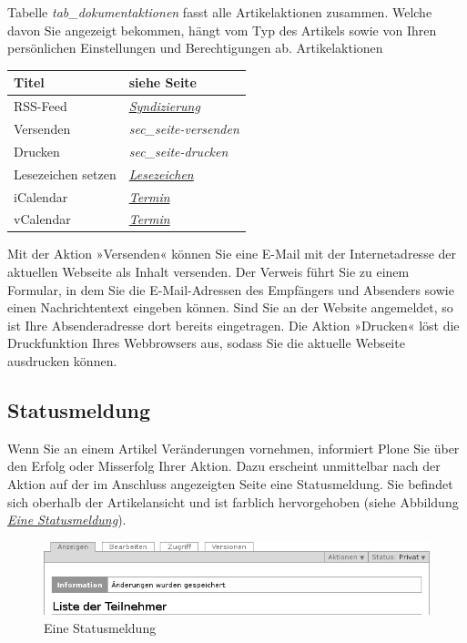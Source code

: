 \documentclass[a4paper,12pt,ngerman]{manual}
\begin{document}
Tabelle \emph{tab\_dokumentaktionen} fasst alle Artikelaktionen
zusammen. Welche davon Sie angezeigt bekommen, hängt vom Typ des
Artikels sowie von Ihren persönlichen Einstellungen und Berechtigungen
ab.
\hypertarget{tab-dokumentaktionen}{}
Artikelaktionen

\begin{tabulary}{\textwidth}{|L|L|}
\hline
\textbf{
Titel
} & \textbf{
siehe Seite
}\\
\hline

RSS-Feed
 & 
\hyperlink{sec-syndizierung}{\emph{Syndizierung}}
\\

Versenden
 & 
\emph{sec\_seite-versenden}
\\

Drucken
 & 
\emph{sec\_seite-drucken}
\\

Lesezeichen setzen
 & 
\hyperlink{sec-navigation-lesezeichen}{\emph{Lesezeichen}}
\\

iCalendar
 & 
\hyperlink{sec-termin}{\emph{Termin}}
\\

vCalendar
 & 
\hyperlink{sec-termin}{\emph{Termin}}
\\
\hline
\end{tabulary}

\hypertarget{sec-seite-versenden}{}
Mit der Aktion »Versenden« können Sie eine E-Mail mit der Internetadresse der
aktuellen Webseite als Inhalt versenden. Der Verweis führt Sie zu einem
Formular, in dem Sie die E-Mail-Adressen des Empfängers und Absenders sowie
einen Nachrichtentext eingeben können. Sind Sie an der Website angemeldet, so
ist Ihre Absenderadresse dort bereits eingetragen.
\hypertarget{sec-seite-drucken}{}
Die Aktion »Drucken« löst die Druckfunktion Ihres Webbrowsers aus, sodass
Sie die aktuelle Webseite ausdrucken können.


\subsection{Statusmeldung}

Wenn Sie an einem Artikel Veränderungen vornehmen, informiert Plone Sie über
den Erfolg oder Misserfolg Ihrer Aktion. Dazu erscheint unmittelbar nach der
Aktion auf der im Anschluss angezeigten Seite eine
Statusmeldung. Sie befindet sich oberhalb der Artikelansicht und ist farblich
hervorgehoben (siehe Abbildung \hyperlink{fig-statusmeldung}{\emph{Eine Statusmeldung}}).
\hypertarget{fig-statusmeldung}{}\begin{figure}[htbp]
\centering

\includegraphics{statusmeldung.png}
\caption{Eine Statusmeldung}\end{figure}
\end{document}
